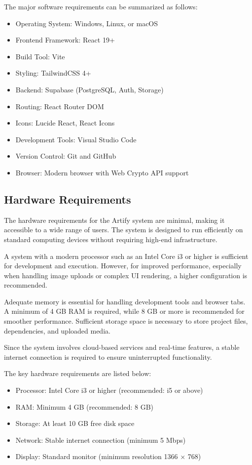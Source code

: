 \documentclass[12pt,a4paper]{report}
\begin{document}
The major software requirements can be summarized as follows:

\begin{itemize}
    \item Operating System: Windows, Linux, or macOS
    \item Frontend Framework: React 19+
    \item Build Tool: Vite
    \item Styling: TailwindCSS 4+
    \item Backend: Supabase (PostgreSQL, Auth, Storage)
    \item Routing: React Router DOM
    \item Icons: Lucide React, React Icons
    \item Development Tools: Visual Studio Code
    \item Version Control: Git and GitHub
    \item Browser: Modern browser with Web Crypto API support
\end{itemize}

\subsection{Hardware Requirements}

The hardware requirements for the Artify system are minimal, making it accessible to a wide range of users. The system is designed to run efficiently on standard computing devices without requiring high-end infrastructure.

A system with a modern processor such as an Intel Core i3 or higher is sufficient for development and execution. However, for improved performance, especially when handling image uploads or complex UI rendering, a higher configuration is recommended.

Adequate memory is essential for handling development tools and browser tabs. A minimum of 4 GB RAM is required, while 8 GB or more is recommended for smoother performance. Sufficient storage space is necessary to store project files, dependencies, and uploaded media.

Since the system involves cloud-based services and real-time features, a stable internet connection is required to ensure uninterrupted functionality.

The key hardware requirements are listed below:

\begin{itemize}
    \item Processor: Intel Core i3 or higher (recommended: i5 or above)
    \item RAM: Minimum 4 GB (recommended: 8 GB)
    \item Storage: At least 10 GB free disk space
    \item Network: Stable internet connection (minimum 5 Mbps)
    \item Display: Standard monitor (minimum resolution 1366 $\times$ 768)
\end{itemize}
\end{document}
